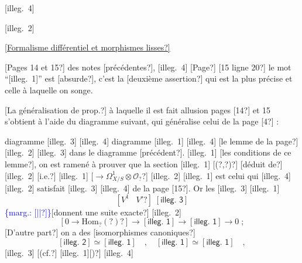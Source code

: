 \documentclass[11pt]{article}
\newcommand{\scanpage}[1]{\par\bigskip\noindent{\small\sffamily[scan #1]}\par}
\newcommand{\mspage}[1]{{\small\sffamily[p.\,#1]}}
\newcommand{\margin}[1]{\textcolor{blue}{\{\textsf{marg.:} #1\}}}
\newcommand{\uline}[1]{\underline{#1}}
\newcommand{\unsure}[1]{[#1?]}
\newcommand{\illegible}[1]{[\textsf{illeg.\ #1}]}
\newenvironment{diagramblock}{\par\begin{center}}{\end{center}\par}
\begin{document}
\mspage{164}

\clearpage
\scanpage{25/165}
\illegible{4}

\illegible{2}

\uline{\unsure{Formalisme différentiel et morphismes lisses}}

\unsure{Pages 14 et 15} des notes \unsure{précédentes}, \illegible{4} \unsure{Page}
\unsure{15 ligne 20} le mot ``\illegible{1}'' est \unsure{absurde}, c'est la \unsure{deuxième assertion} qui est la
plus précise et celle à laquelle on songe.

\unsure{La généralisation de prop.} à laquelle il est fait allusion pages \unsure{14}
et 15 s'obtient à l'aide du diagramme suivant, qui généralise celui de la
page \unsure{4} :
\begin{diagramblock}
\end{diagramblock}
\illegible{3} diagramme \illegible{3} \illegible{4} diagramme \illegible{1}
\illegible{4} \unsure{le lemme de la page} \illegible{2}
\illegible{3} dans le diagramme \unsure{précédent}. \illegible{1}
\unsure{les conditions de ce lemme}, on est ramené à prouver que la section
\illegible{1} \unsure{(?,?)} \unsure{déduit de} \illegible{2} \unsure{i.e.} \illegible{1} \unsure{$\to \Omega^1_{X/S}\otimes\mathcal{O}_?$}
\illegible{2} \illegible{1} est celui qui \illegible{4}
\illegible{2} satisfait \illegible{3} \illegible{4} de la
page \unsure{15}. Or les \illegible{3} \illegible{1}
\[ \unsure{V^1 \;\;\; V'} \;\illegible{3} \]
\margin{\unsure{||}}\unsure{donnent une suite exacte} \illegible{2}
\[ \unsure{0 \to \mathrm{Hom}_{?}(?)} \to \illegible{1} \to \illegible{1} \to 0 \; ; \]
\unsure{D'autre part} on a des \unsure{isomorphismes canoniques}
\[ \illegible{2} \simeq \illegible{1} \quad , \quad \illegible{1} \simeq \illegible{1} \quad , \]
\illegible{3} \unsure{(cf.} \illegible{1}\unsure{)} \illegible{4}
\end{document}
